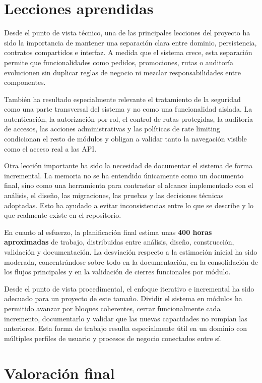 \section{Lecciones aprendidas}

Desde el punto de vista técnico, una de las principales lecciones del proyecto ha sido la importancia de mantener una separación clara entre dominio, persistencia, contratos compartidos e interfaz. A medida que el sistema crece, esta separación permite que funcionalidades como pedidos, promociones, rutas o auditoría evolucionen sin duplicar reglas de negocio ni mezclar responsabilidades entre componentes.

También ha resultado especialmente relevante el tratamiento de la seguridad como una parte transversal del sistema y no como una funcionalidad aislada. La autenticación, la autorización por rol, el control de rutas protegidas, la auditoría de accesos, las acciones administrativas y las políticas de rate limiting condicionan el resto de módulos y obligan a validar tanto la navegación visible como el acceso real a las API.

Otra lección importante ha sido la necesidad de documentar el sistema de forma incremental. La memoria no se ha entendido únicamente como un documento final, sino como una herramienta para contrastar el alcance implementado con el análisis, el diseño, las migraciones, las pruebas y las decisiones técnicas adoptadas. Esto ha ayudado a evitar inconsistencias entre lo que se describe y lo que realmente existe en el repositorio.

En cuanto al esfuerzo, la planificación final estima unas \textbf{400 horas aproximadas} de trabajo, distribuidas entre análisis, diseño, construcción, validación y documentación. La desviación respecto a la estimación inicial ha sido moderada, concentrándose sobre todo en la documentación, en la consolidación de los flujos principales y en la validación de cierres funcionales por módulo.

Desde el punto de vista procedimental, el enfoque iterativo e incremental ha sido adecuado para un proyecto de este tamaño. Dividir el sistema en módulos ha permitido avanzar por bloques coherentes, cerrar funcionalmente cada incremento, documentarlo y validar que las nuevas capacidades no rompían las anteriores. Esta forma de trabajo resulta especialmente útil en un dominio con múltiples perfiles de usuario y procesos de negocio conectados entre sí.

\section{Valoración final}


